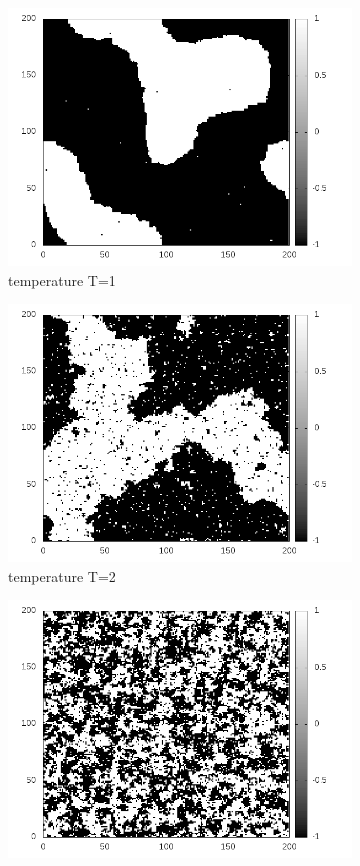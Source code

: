 \documentclass[10pt,a4paper]{article}
\begin{document}
\begin{figure}[h]
\begin{subfigure}{.5\textwidth}
  \centering
  \includegraphics[width=.8\linewidth]{spinlatticeT1.png}
  \caption{temperature T=1}
  \label{fig:sfig1}
\end{subfigure}%
\begin{subfigure}{.5\textwidth}
  \centering
  \includegraphics[width=.8\linewidth]{spinlatticeT2.png}
  \caption{temperature T=2}
  \label{fig:sfig2}
\end{subfigure}
\begin{subfigure}{.5\textwidth}
  \centering
  \includegraphics[width=.8\linewidth]{spinlatticeTc.png}

\end{subfigure}
\end{figure}
\end{document}

